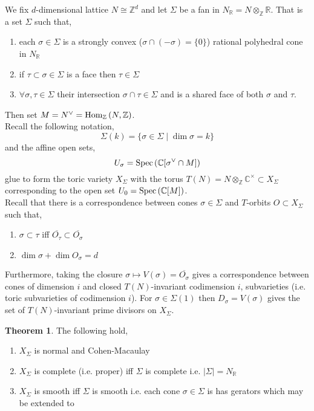 \documentclass[12pt]{extarticle}
\newcommand{\Z}{\mathbb{Z}}
\newcommand{\R}{\mathbb{R}}
\newcommand{\C}{\mathbb{C}}
\theoremstyle{definition}
\newtheorem{theorem}{Theorem}[section]
\begin{document}
We fix $d$-dimensional lattice $N \cong \Z^d$ and let $\Sigma$ be a fan in $N_\R = N \otimes_\Z \R$. That is a set $\Sigma$ such that,
\begin{enumerate}
\item each $\sigma \in \Sigma$ is a strongly convex ($\sigma \cap (-\sigma) = \{ 0 \}$) rational polyhedral cone in $N_\R$ 
\item if $\tau \subset \sigma \in \Sigma$ is a face then $\tau \in \Sigma$
\item $\forall \sigma, \tau \in \Sigma$ their intersection $\sigma \cap \tau \in \Sigma$ and is a shared face of both $\sigma$ and $\tau$.
\end{enumerate}
Then set $M = N^\vee = \Homover{\Z}{N}{\Z}$. 
\bigskip\\
Recall the following notation,
\[ \Sigma(k) = \{ \sigma \in \Sigma \mid \dim{\sigma} = k \} \]
and the affine open sets,
\[ U_\sigma = \Spec{\C[\sigma^\vee \cap M]} \]
glue to form the toric variety $X_\Sigma$ with the torus $T(N) = N \otimes_\Z \C^\times \subset X_\Sigma$ corresponding to the open set $U_{0} = \Spec{\C[M]}$. 
\bigskip\\
Recall that there is a correspondence between cones $\sigma \in \Sigma$ and $T$-orbits $O \subset X_\Sigma$ such that,
\begin{enumerate}
\item $\sigma \subset \tau$ iff $\overline{O_\tau} \subset \overline{O_\sigma}$
\item $\dim{\sigma} + \dim{O_\sigma} = d$
\end{enumerate}
Furthermore, taking the closure $\sigma \mapsto V(\sigma) = \overline{O_\sigma}$ gives a correspondence between cones of dimension $i$ and closed $T(N)$-invariant codimension $i$, subvarieties (i.e. toric subvarieties of codimension $i$). For $\sigma \in \Sigma(1)$ then $D_\sigma = V(\sigma)$ gives the set of $T(N)$-invariant prime divisors on $X_\Sigma$.

\begin{theorem}
The following hold,
\begin{enumerate}
\item $X_\Sigma$ is normal and Cohen-Macaulay
\item $X_\Sigma$ is complete (i.e. proper) iff $\Sigma$ is complete i.e. $|\Sigma| = N_\R$
\item $X_\Sigma$ is smooth iff $\Sigma$ is smooth i.e. each cone $\sigma \in \Sigma$ is has gerators which may be extended to 
\end{enumerate}
\end{theorem}
\end{document}
